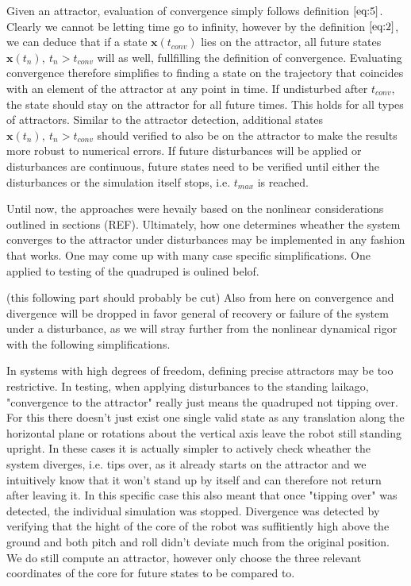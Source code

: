     Given an attractor, evaluation of convergence simply follows definition $\ref{eq:5}$. Clearly we cannot be letting time go to infinity, however by the definition $\ref{eq:2}$, we can deduce that if a state $\mathbf{x}(t_{conv})$ lies on the attractor, all future states $\mathbf{x}(t_n),\ t_n > t_{conv}$ will as well, fullfilling the definition of convergence. 
 Evaluating convergence therefore simplifies to finding a state on the trajectory that coincides with an element of the attractor at any point in time. If undisturbed after $t_{conv}$, the state should stay on the attractor for all future times. This holds for all types of attractors. Similar to the attractor detection, additional states $\mathbf{x}(t_n),\ t_n > t_{conv}$ should verified to also be on the attractor to make the results more robust to numerical errors. If future disturbances will be applied or disturbances are continuous, future states need to be verified until either the disturbances or the simulation itself stops, i.e. $t_{max}$ is reached. 

 Until now, the approaches were hevaily based on the nonlinear considerations outlined in sections (REF). Ultimately, how one determines wheather the system converges to the attractor under disturbances may be implemented in any fashion that works. One may come up with many case specific simplifications. One applied to testing of the quadruped is oulined belof. 

 (this following part should probably be cut)
 Also from here on convergence and divergence will be dropped in favor general of recovery or failure of the system under a disturbance, as we will stray further from the nonlinear dynamical rigor with the following simplifications. 

 In systems with high degrees of freedom, defining precise attractors may be too restrictive. 
 In testing, when applying disturbances to the standing laikago, "convergence to the attractor" really just means the quadruped not tipping over. For this there doesn't just exist one single valid state as any translation along the horizontal plane or rotations about the vertical axis leave the robot still standing upright. In these cases it is actually simpler to actively check wheather the system diverges, i.e. tips over, as it already starts on the attractor and we intuitively know that it won't stand up by itself and can therefore not return after leaving it. In this specific case this also meant that once "tipping over" was detected, the individual simulation was stopped.  Divergence was detected by verifying that the hight of the core of the robot was suffitiently high above the ground and both pitch and roll didn't deviate much from the original position. We do still compute an attractor, however only choose the three relevant coordinates of the core for future states to be compared to. 

